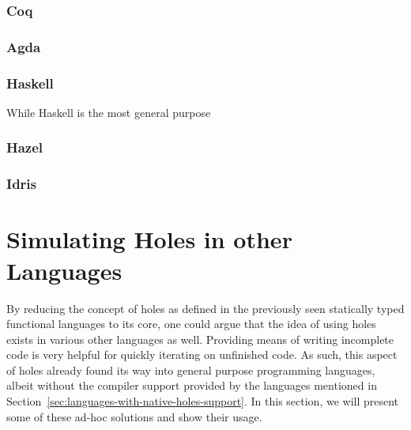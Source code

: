 \subsubsection{Coq}

\subsubsection{Agda}

\subsubsection{Haskell}
While Haskell is the most general purpose 

\subsubsection{Hazel}

\subsubsection{Idris}

\section{Simulating Holes in other Languages}
\label{sec:simulating-holes}
By reducing the concept of holes as defined in the previously seen statically typed functional languages to its core, one could argue that the idea of using holes exists in various other languages as well.
Providing means of writing incomplete code is very helpful for quickly iterating on unfinished code.
As such, this aspect of holes already found its way into general purpose programming languages, albeit without the compiler support provided by the languages mentioned in Section~\ref{sec:languages-with-native-holes-support}.
In this section, we will present some of these ad-hoc solutions and show their usage.

